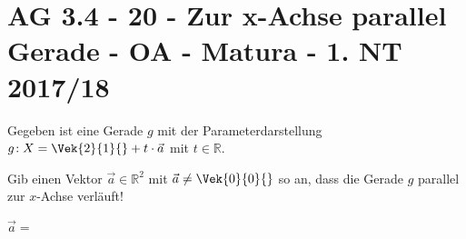 \section{AG 3.4 - 20 - Zur x-Achse parallel Gerade - OA - Matura - 1. NT 2017/18}

\begin{beispiel}[AG 3.4]{1}
Gegeben ist eine Gerade $g$ mit der Parameterdarstellung $g\!:X=\Vek{2}{1}{}+t\cdot\vec{a}$ mit $t\in\mathbb{R}$.

Gib einen Vektor $\vec{a}\in\mathbb{R}^2$ mit $\vec{a}\neq\Vek{0}{0}{}$ so an, dass die Gerade $g$ parallel zur $x$-Achse verläuft!

$\vec{a}=$\,
\end{beispiel}